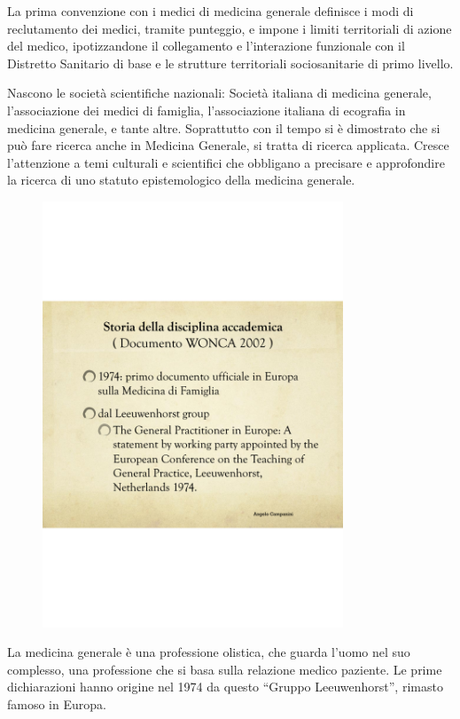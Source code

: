La prima convenzione con i medici di medicina generale definisce i modi
di reclutamento dei medici, tramite punteggio, e impone i limiti
territoriali di azione del medico, ipotizzandone il collegamento e
l'interazione funzionale con il Distretto Sanitario di base e le
strutture territoriali sociosanitarie di primo livello.

Nascono le società scientifiche nazionali: Società italiana di medicina
generale, l'associazione dei medici di famiglia, l'associazione italiana
di ecografia in medicina generale, e tante altre. Soprattutto con il
tempo si è dimostrato che si può fare ricerca anche in Medicina
Generale, si tratta di ricerca applicata. Cresce l'attenzione a temi
culturali e scientifici che obbligano a precisare e approfondire la
ricerca di uno statuto epistemologico della medicina generale.

\begin{figure}[!ht]
\centering
	\includegraphics[width=0.8\textwidth]{38/image6.png}
	\end{figure}
	
La medicina generale è una professione olistica, che guarda l'uomo nel
suo complesso, una professione che si basa sulla relazione medico
paziente. Le prime dichiarazioni hanno origine nel 1974 da questo
``Gruppo Leeuwenhorst'', rimasto famoso in Europa.

